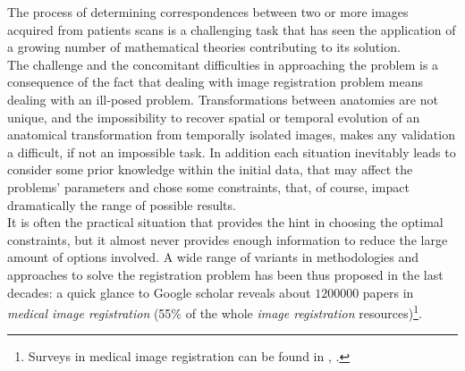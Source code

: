 The process of determining correspondences between two or more images acquired from patients scans is a challenging task that has seen the application of a growing number of mathematical theories contributing to its solution.\\
The challenge and the concomitant difficulties in approaching the problem is a consequence of the fact that dealing with image registration problem means dealing with an ill-posed problem. Transformations between anatomies are not unique, and the impossibility to recover spatial or temporal evolution of an anatomical transformation from temporally isolated images, makes any validation a difficult, if not an impossible task. 
In addition each situation inevitably leads to consider some prior knowledge within the initial data, that may affect the problems' parameters and chose some constraints, that, of course, impact dramatically the range of possible results. \\
It is often the practical situation that provides the hint in choosing the optimal constraints, but it almost never provides enough information to reduce the large amount of options involved. A wide range of variants in methodologies and approaches to solve the registration problem has been thus proposed in the last decades: a quick glance to Google scholar reveals about $1200000$ papers in \emph{medical image registration} (55\% of the whole \emph{image registration} resources)\footnote{Surveys in medical image registration can be found in \cite{Sotiras:survey:13}, \cite{zitova2003image}.}.

